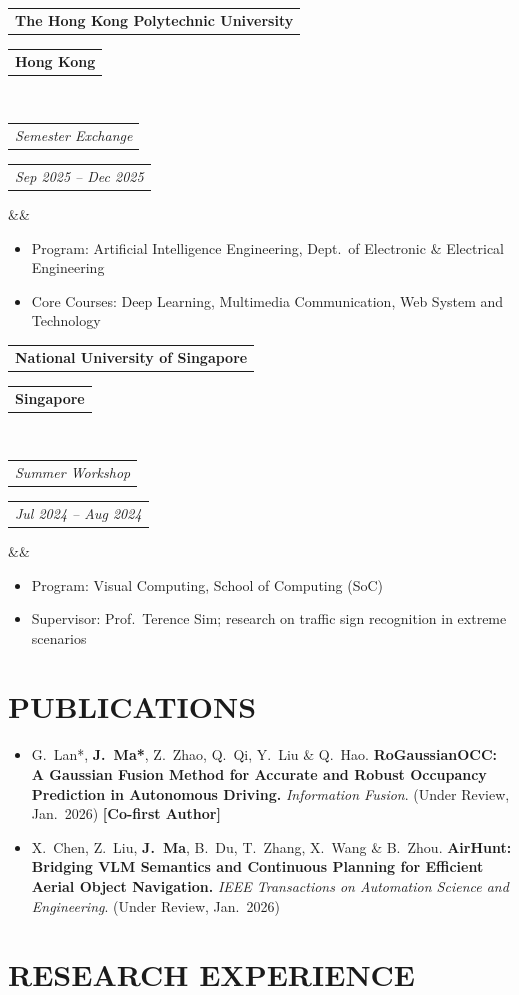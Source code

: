 \documentclass[11pt,a4paper,roman]{moderncv}
\makeatletter
\newcommand*{\customcventry}[7][.25em]{
  \begin{tabular}{@{}l} 
    {\textbf{#4}}        %
  \end{tabular}
  \hfill
  \begin{tabular}{l@{}}
    {\textbf{#5}}        %
  \end{tabular} \\
  \begin{tabular}{@{}l} 
    {\textit{#3}}        %
  \end{tabular}
  \hfill
  \begin{tabular}{l@{}}
    {\textit{#2}}        %
  \end{tabular}
  \ifx&#7&%
  \else{\\%
    \begin{minipage}{\maincolumnwidth}%
      \small#7%
  \end{minipage}}\fi%
  \par\addvspace{#1}}
\makeatother
\begin{document}
{\customcventry{Sep 2025 -- Dec 2025}{Semester Exchange}{The Hong Kong Polytechnic University}{Hong Kong}{}{}}
\begin{itemize}
  \item[--] Program: Artificial Intelligence Engineering, Dept.\ of Electronic \& Electrical Engineering
  \item[--] Core Courses: Deep Learning, Multimedia Communication, Web System and Technology
\end{itemize}
\vspace{2mm}

{\customcventry{Jul 2024 -- Aug 2024}{Summer Workshop}{National University of Singapore}{Singapore}{}{}}
\begin{itemize}
  \item[--] Program: Visual Computing, School of Computing (SoC)
  \item[--] Supervisor: Prof.\ Terence Sim; research on traffic sign recognition in extreme scenarios
\end{itemize}
\section{PUBLICATIONS}

\begin{itemize}
  \item G.~Lan*, \textbf{J.~Ma*}, Z.~Zhao, Q.~Qi, Y.~Liu \& Q.~Hao.
    \textbf{RoGaussianOCC: A Gaussian Fusion Method for Accurate and Robust Occupancy Prediction in Autonomous Driving.}
    \emph{Information Fusion}. (Under Review, Jan.\ 2026) \textbf{[Co-first Author]}
  \vspace{2mm}
  \item X.~Chen, Z.~Liu, \textbf{J.~Ma}, B.~Du, T.~Zhang, X.~Wang \& B.~Zhou.
    \textbf{AirHunt: Bridging VLM Semantics and Continuous Planning for Efficient Aerial Object Navigation.}
    \emph{IEEE Transactions on Automation Science and Engineering}. (Under Review, Jan.\ 2026)
\end{itemize}

\section{RESEARCH EXPERIENCE}
\end{document}
